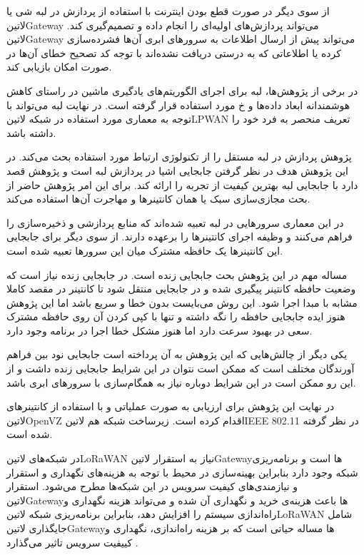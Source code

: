 از سوی دیگر در صورت قطع بودن اینترنت با استفاده از پردازش در لبه شی یا ‌لاتین{Gateway} می‌تواند پردازش‌های اولیه‌ای را انجام داده و تصمیم‌گیری کند.
‌لاتین{Gateway} می‌تواند پیش از ارسال اطلاعات به سرورهای ابری آن‌ها فشرده‌سازی کرده یا اطلاعاتی که به درستی دریافت نشده‌اند با توجه کد تصحیح خطای آن‌ها
در صورت امکان بازیابی کند.

در برخی از پژوهش‌ها، لبه برای اجرای الگوریتم‌های یادگیری ماشین در راستای کاهش هوشمندانه ابعاد داده‌ها و ‌خ مورد استفاده قرار گرفته است.
در نهایت لبه می‌تواند با توجه به معماری مورد استفاده در شبکه ‌لاتین{LPWAN} تعریف منحصر به فرد خود را داشته باشد.


پژوهش  پردازش در لبه مستقل را از تکنولوژی ارتباط مورد استفاده بحث می‌کند. در این پژوهش هدف در نظر گرفتن جابجایی اشیا در پردازش لبه است و پژوهش قصد دارد
با جابجایی لبه بهترین کیفیت از تجربه را ارائه کند. برای این امر پژوهش حاضر از بحث مجازی‌سازی سبک یا همان کانتینرها و مهاجرت آن‌ها استفاده می‌کند.

در این معماری سرورهایی در لبه تعبیه شده‌اند که منابع پردازشی و ذخیره‌سازی را فراهم می‌کنند و وظیفه اجرای کانتینرها را برعهده دارند. از سوی دیگر برای جابجایی این کانتینرها یک حافظه مشترک
میان این سرورها تعبیه شده است.

مساله مهم در این پژوهش بحث جابجایی زنده است. در جابجایی زنده نیاز است که وضعیت حافظه کانتینر پیگیری شده و در جابجایی منتقل شود تا کانتینر در مقصد کاملا مشابه با مبدا اجرا شود.
این روش می‌بایست بدون خطا و سریع باشد اما این پژوهش هنوز ایده جابجایی حافظه را نگه داشته و تنها با کپی کردن آن روی حافظه مشترک سعی در بهبود سرعت دارد اما هنوز مشکل خطا
اجرا در برنامه وجود دارد.

یکی دیگر از چالش‌هایی که این پژوهش به آن پرداخته است جابجایی نود بین فراهم آورندگان مختلف است که ممکن است نتوان در این شرایط جابجایی زنده داشت و از این رو ممکن است
در این شرایط دوباره نیاز به همگام‌سازی با سرورهای ابری باشد.

در نهایت این پژوهش برای ارزیابی به صورت عملیاتی و با استفاده از کانتینرهای ‌لاتین{OpenVZ} اقدام کرده است. زیرساخت شبکه هم ‌لاتین{IEEE 802.11} در نظر گرفته شده است.



در شبکه‌های ‌لاتین{LoRaWAN} نیاز به استقرار ‌لاتین{Gateway}ها است و برنامه‌ریزی شبکه وجود دارد بنابراین بهینه‌سازی در محیط با توجه به هزینه‌های نگهداری و استقرار و نیازمندی‌های کیفیت سرویس
در این شبکه‌ها مطرح می‌شود. استقرار ‌لاتین{Gateway}ها باعث هزینه‌ی خرید و نگهداری آن شده و می‌تواند هزینه نگهداری و راه‌اندازی سیستم را افزایش دهد،
بنابراین برنامه‌ریزی شبکه ‌لاتین{LoRaWAN} شامل جایگذاری ‌لاتین{Gateway}ها مساله حیاتی است که بر هزینه راه‌اندازی، نگهداری و کییفیت سرویس تاثیر می‌گذارد
.

